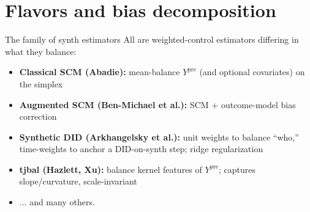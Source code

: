 \documentclass[xcolor=dvipsnames]{beamer}
\newcommand\makegaps{\addtolength{\itemsep}{.25\baselineskip}}
\newcommand{\Ypre}{Y^{\text{pre}}}        %
\begin{document}
\section{Flavors and bias decomposition}


\begin{frame}{The family of synth estimators}
  \small
All are weighted-control estimators differing in what they balance:
\smallskip
\begin{itemize}\makegaps
  \item<1-> \textbf{Classical SCM (Abadie):} mean-balance $\Ypre$ (and optional covariates) on the simplex
  \item<2-> \textbf{Augmented SCM (Ben-Michael et al.):} SCM + outcome-model bias correction
  \item<3-> \textbf{Synthetic DID (Arkhangelsky et al.):} unit weights to balance ``who,'' time-weights to anchor a DID-on-synth step; ridge regularization
  \item<4-> \textbf{tjbal (Hazlett, Xu):} balance kernel features of $\Ypre$; captures slope/curvature, scale-invariant
  \item<5-> ... and many others.
\end{itemize}
\bigskip
{}
\end{frame}
\end{document}
